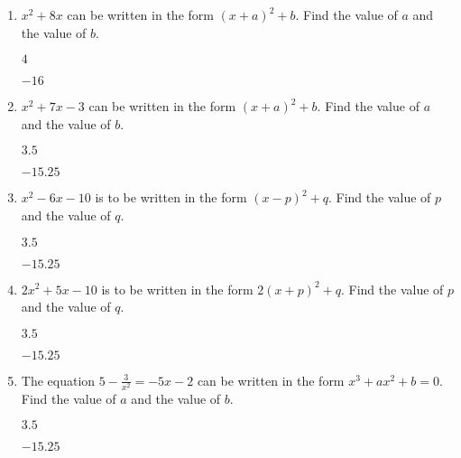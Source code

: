 \begin{enumerate}[leftmargin=0cm] 

\item $x^2+8x$ can be written in the form $(x+a)^2+b$. Find the value of $a$ and the value of $b$.
    \begin{envAnswer}[blankline=3]         $     4          $ \end{envAnswer}
    \begin{envAnswer}[blankline=0]         $   -16          $ \end{envAnswer}


\item $x^2+7x -3$ can be written in the form $(x+a)^2+b$. Find the value of $a$ and the value of $b$.
    \begin{envAnswer}[blankline=3]         $     3.5        $ \end{envAnswer}
    \begin{envAnswer}[blankline=0]         $   -15.25       $ \end{envAnswer}


\item $x^2-6x -10$ is to be written in the form $(x-p)^2+q$. Find the value of $p$ and the value of $q$.
    \begin{envAnswer}[blankline=3]         $     3.5        $ \end{envAnswer}
    \begin{envAnswer}[blankline=0]         $   -15.25       $ \end{envAnswer}


\item $2x^2+5x -10$ is to be written in the form $2(x+p)^2+q$. Find the value of $p$ and the value of $q$.
    \begin{envAnswer}[blankline=3]         $     3.5        $ \end{envAnswer}
    \begin{envAnswer}[blankline=0]         $   -15.25       $ \end{envAnswer}


\item The equation $5-\frac{3}{x^2}=-5x-2$ can be written in the form $x^3+ax^2+b=0$. Find the value of $a$ and the value of $b$.
    \begin{envAnswer}[blankline=3]         $     3.5        $ \end{envAnswer}
    \begin{envAnswer}[blankline=0]         $   -15.25       $ \end{envAnswer}




\end{enumerate}



